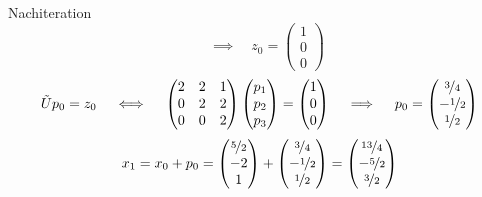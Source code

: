 \begin{example}{Nachiteration}
\[        \quad \implies \quad
        z_0 = \begin{pmatrix}
            1 \\
            0 \\
            0
        \end{pmatrix}
    \]
    \[
        \tilde{U} p_0 = z_0 \quad \iff \quad \begin{pmatrix}
            2 & 2 & 1 \\
            0 & 2 & 2 \\
            0 & 0 & 2
        \end{pmatrix}
        \begin{pmatrix}
            p_1 \\
            p_2 \\
            p_3
        \end{pmatrix}
        =
        \begin{pmatrix}
            1 \\
            0 \\
            0
        \end{pmatrix}
        \quad \implies \quad
        p_0 = \begin{pmatrix}
            \nicefrac{3}{4}  \\
            -\nicefrac{1}{2} \\
            \nicefrac{1}{2}
        \end{pmatrix}
    \]
    \[
        x_1 = x_0 + p_0 =
        \begin{pmatrix}
            \nicefrac{5}{2} \\
            -2              \\
            1
        \end{pmatrix}
        +
        \begin{pmatrix}
            \nicefrac{3}{4}  \\
            -\nicefrac{1}{2} \\
            \nicefrac{1}{2}
        \end{pmatrix}
        =
        \begin{pmatrix}
            \nicefrac{13}{4} \\
            -\nicefrac{5}{2} \\
            \nicefrac{3}{2}
        \end{pmatrix}
    \]


\end{example}
